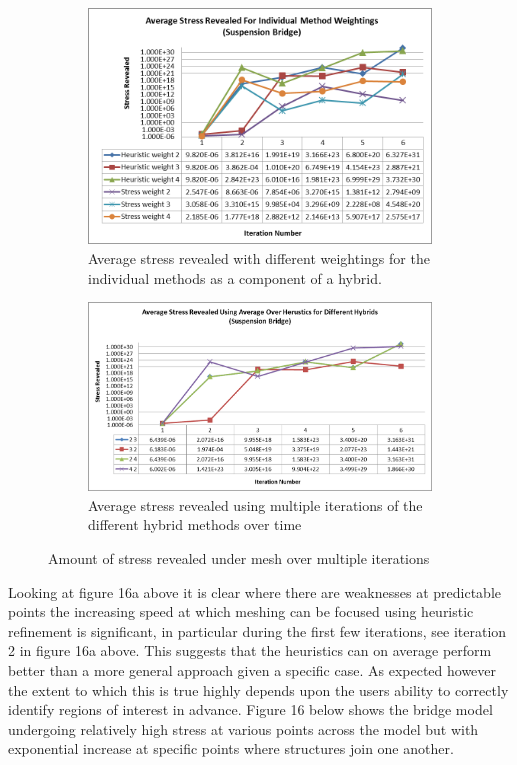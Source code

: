 \begin{figure}[H]
\centering
\begin{subfigure}{.5\textwidth}
  \centering
  \includegraphics[width=0.9\linewidth]{../Graphics/Graphs/AverageStressesBridge/AverageStressRevealedForIndividualMethodWeightings.png}
  \caption{Average stress revealed with different weightings for the individual methods as a component of a hybrid.}
  \label{fig:sub1}
\end{subfigure}%
\begin{subfigure}{.5\textwidth}
  \centering
  \includegraphics[width=1.1\linewidth]{../Graphics/Graphs/AverageStressesBridge/HybridResultsAveraged.png}
  \caption{Average stress revealed using multiple iterations of the different hybrid methods over time}
  \label{fig:sub2}
\end{subfigure}
\label{fig:test}
  \caption{Amount of stress revealed under mesh over multiple iterations}
 \end{figure}


\noindent
Looking at figure 16a above it is clear where there are weaknesses at predictable points the increasing speed at which meshing can be focused using heuristic refinement is significant, in particular during the first few iterations, see iteration 2 in figure 16a above. This suggests that the heuristics can on average perform better than a more general approach given a specific case. As expected however the extent to which this is true highly depends upon the users ability to correctly identify regions of interest in advance. Figure 16 below shows the bridge model undergoing relatively high stress at various points across the model but with exponential increase at specific points where structures join one another. \\ 

